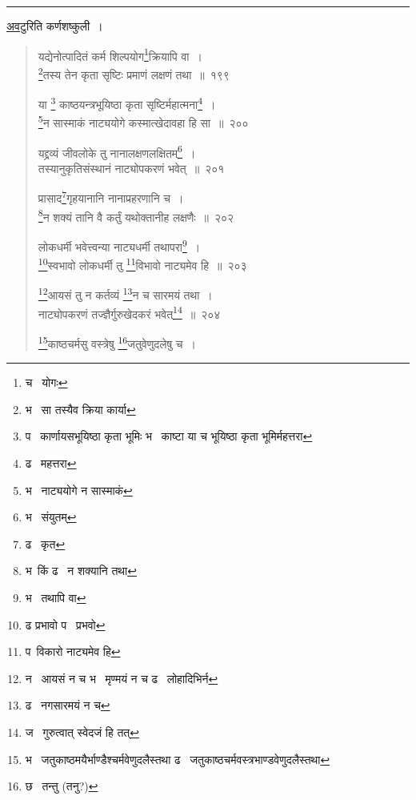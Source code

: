\documentclass[11pt, openany]{book}
\begin{document}
\hrule

\vspace{2mm}
{\small \underline{अव}टुरिति कर्णशष्कुली~।}

\newpage

\begin{quote}
{\na यद्येनोत्पादितं कर्म शिल्पयोग\renewcommand{\thefootnote}{1}\footnote{च \textendash\ योगः}क्रियापि वा~।\\
\renewcommand{\thefootnote}{2}\footnote{भ \textendash\ सा तस्यैव क्रिया कार्या}तस्य तेन कृता सृष्टिः प्रमाणं लक्षणं तथा~॥~१९९

या \renewcommand{\thefootnote}{3}\footnote{प \textendash\ कार्णायसभूयिष्ठा कृता भूमिः भ \textendash\ काष्टा या च भूयिष्ठा कृता भूमिर्महत्तरा} काष्ठयन्त्रभूयिष्ठा कृता सृष्टिर्महात्मना\renewcommand{\thefootnote}{4}\footnote{ढ \textendash\ महत्तरा}~।\\
\renewcommand{\thefootnote}{5}\footnote{भ \textendash\ नाट्ययोगे न सास्माकं}न सास्माकं नाट्ययोगे कस्मात्खेदावहा हि सा~॥~२००

यद्द्रव्यं जीवलोके तु नानालक्षणलक्षितम्\renewcommand{\thefootnote}{6}\footnote{भ \textendash\ संयुतम्}~।\\
तस्यानुकृतिसंस्थानं नाट्योपकरणं भवेत्~॥~२०१

प्रासाद\renewcommand{\thefootnote}{7}\footnote{ढ \textendash\ कृत}गृहयानानि नानाप्रहरणानि च~।\\
\renewcommand{\thefootnote}{8}\footnote{भ\textendash\ किं ढ \textendash\ न शक्यानि तथा}न शक्यं तानि वै कर्तुं यथोक्तानीह लक्षणैः~॥~२०२

लोकधर्मी भवेत्त्वन्या नाट्यधर्मी तथापरा\renewcommand{\thefootnote}{9}\footnote{भ \textendash\ तथापि वा}~।\\
\renewcommand{\thefootnote}{10}\footnote{ढ प्रभावो प \textendash\ प्रभवो}स्वभावो लोकधर्मी तु \renewcommand{\thefootnote}{11}\footnote{प\textendash\ विकारो नाट्यमेव हि}विभावो नाट्यमेव हि~॥~२०३

\renewcommand{\thefootnote}{12}\footnote{न \textendash\ आयसं न च भ \textendash\ मृण्मयं न च ढ \textendash\ लोहादिभिर्न}आयसं तु न कर्तव्यं \renewcommand{\thefootnote}{13}\footnote{ढ \textendash\ नगसारमयं न च}न च सारमयं तथा~।\\
नाट्योपकरणं तज्ज्ञैर्गुरुखेदकरं भवेत्\renewcommand{\thefootnote}{14}\footnote{ज \textendash\ गुरुत्वात् स्वेदजं हि तत्}~॥~२०४

\renewcommand{\thefootnote}{15}\footnote{भ \textendash\ जतुकाष्ठमयैर्भाण्डैश्चर्मवेणुदलैस्तथा ढ \textendash\ जतुकाष्ठचर्मवस्त्रभाण्डवेणुदलैस्तथा}काष्ठचर्मसु वस्त्रेषु \renewcommand{\thefootnote}{16}\footnote{छ \textendash\ तन्तु (तनु?)}जतुवेणुदलेषु च~।}
\end{quote}
\end{document}
